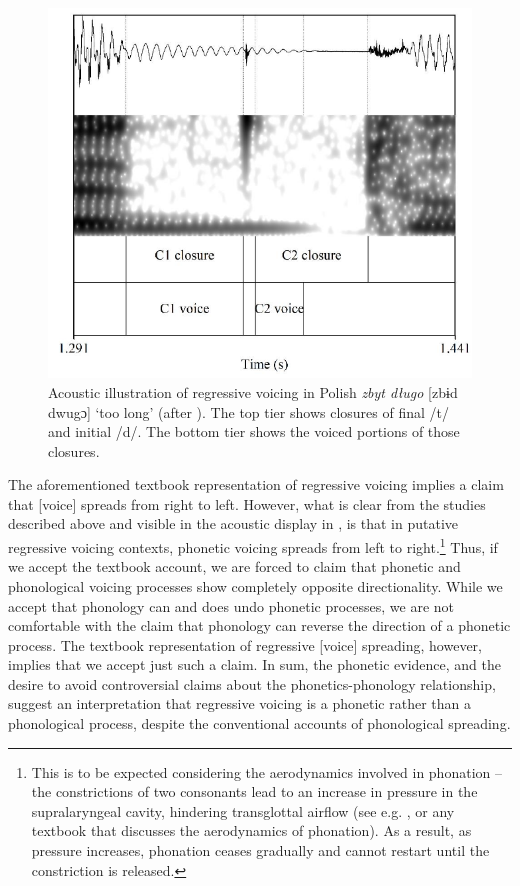 \documentclass[output=paper]{langscibook}
\begin{document}
\begin{figure}
\caption{\label{fig:schwartz:1} Acoustic illustration of regressive voicing in Polish \textit{zbyt długo} [zbɨd dwugɔ] ‘too long’ (after \citealt{Schwartz2019}). The top tier shows closures of final /t/ and initial /d/. The bottom tier shows the voiced portions of those closures.}
\includegraphics[width=.8\textwidth]{figures/SchwartzUlfsbjorninn-img003.pdf}
\end{figure}

The aforementioned textbook representation of regressive voicing implies a claim that [voice] spreads from right to left. However, what is clear from the studies described above and visible in the acoustic display in , is that in putative regressive voicing contexts, phonetic voicing spreads from left to right.\footnote{This is to be expected considering the aerodynamics involved in phonation – the constrictions of two consonants lead to an increase in pressure in the supralaryngeal cavity, hindering transglottal airflow (see e.g. \citealt{Stevens1998}, or any textbook that discusses the aerodynamics of phonation). As a result, as pressure increases, phonation ceases gradually and cannot restart until the constriction is released.} Thus, if we accept the textbook account, we are forced to claim that phonetic and phonological voicing processes show completely opposite directionality. While we accept that phonology can and does undo phonetic processes, we are not comfortable with the claim that phonology can reverse the direction of a phonetic process. The textbook representation of regressive [voice] spreading, however, implies that we accept just such a claim. In sum, the phonetic evidence, and the desire to avoid controversial claims about the phonetics-phonology relationship, suggest an interpretation that regressive voicing is a phonetic rather than a phonological process, despite the conventional accounts of phonological spreading.
\end{document}
